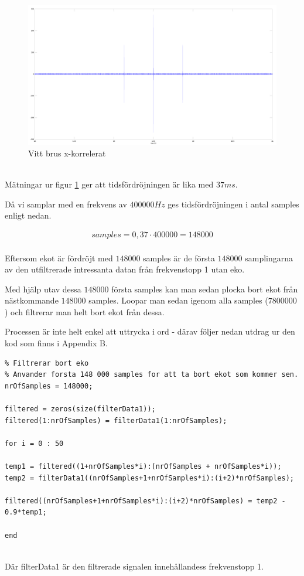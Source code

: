 \documentclass[10pt]{article}
\begin{document}
\begin{figure}[htp]
  \begin{center}
  \includegraphics[keepaspectratio=true,width=\linewidth]{xCorr.png}  %
  \end{center}
  \caption{Vitt brus x-korrelerat} %
  \label{fig:xCorr}
\end{figure}
~\\
Mätningar ur figur \ref{fig:xCorr} ger att tidsfördröjningen är lika med $37 ms$. 

Då vi samplar med en frekvens av $400 000 Hz$ ges tidsfördröjningen i antal samples enligt nedan. 

\begin{gather}
samples = 0,37 \cdot 400 000 = 148 000
\label{equ:delaySamples}
\end{gather}
~\\
Eftersom ekot är fördröjt med $148 000$ samples är de första $148 000$ samplingarna av den utfiltrerade intressanta datan från frekvenstopp 1 utan eko. 

Med hjälp utav dessa $148 000$ första samples kan man sedan plocka bort ekot från nästkommande $148 000$ samples. Loopar man sedan igenom alla samples ($7 800 000$) och filtrerar man helt bort ekot från dessa. 

Processen är inte helt enkel att uttrycka i ord - därav följer nedan utdrag ur den kod som finns i Appendix B. 

\begin{lstlisting}
% Filtrerar bort eko
% Anvander forsta 148 000 samples for att ta bort ekot som kommer sen.
nrOfSamples = 148000;

filtered = zeros(size(filterData1));
filtered(1:nrOfSamples) = filterData1(1:nrOfSamples);

for i = 0 : 50

temp1 = filtered((1+nrOfSamples*i):(nrOfSamples + nrOfSamples*i));
temp2 = filterData1((nrOfSamples+1+nrOfSamples*i):(i+2)*nrOfSamples);

filtered((nrOfSamples+1+nrOfSamples*i):(i+2)*nrOfSamples) = temp2 - 0.9*temp1;

end
\end{lstlisting}
~\\
Där filterData1 är den filtrerade signalen innehållandess frekvenstopp 1. 
\end{document}
